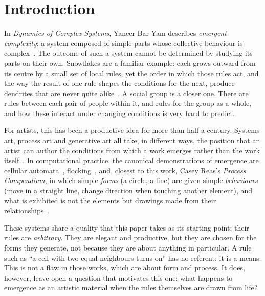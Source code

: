 \section{Introduction}
\label{sec:introduction}

In \emph{Dynamics of Complex Systems}, Yaneer Bar-Yam describes \emph{emergent complexity}: a system composed of simple parts whose collective behaviour is complex~\cite{baryam1997}. The outcome of such a system cannot be determined by studying its parts on their own. Snowflakes are a familiar example: each grows outward from its centre by a small set of local rules, yet the order in which those rules act, and the way the result of one rule shapes the conditions for the next, produce dendrites that are never quite alike~\cite{snowflake2022}. A social group is a closer one. There are rules between each pair of people within it, and rules for the group as a whole, and how these interact under changing conditions is very hard to predict.

For artists, this has been a productive idea for more than half a century. Systems art, process art and generative art all take, in different ways, the position that an artist can author the conditions from which a work emerges rather than the work itself~\cite{burnham1968, galanter2003, boden2009}. In computational practice, the canonical demonstrations of emergence are cellular automata~\cite{wolfram2002, gardner1970}, flocking~\cite{reynolds1987}, and, closest to this work, Casey Reas's \emph{Process Compendium}, in which simple \emph{forms} (a circle, a line) are given simple \emph{behaviours} (move in a straight line, change direction when touching another element), and what is exhibited is not the elements but drawings made from their relationships~\cite{reas2010, reasgithub}.

These systems share a quality that this paper takes as its starting point: their rules are \emph{arbitrary}. They are elegant and productive, but they are chosen for the forms they generate, not because they are about anything in particular. A rule such as ``a cell with two equal neighbours turns on'' has no referent; it is a means. This is not a flaw in those works, which are about form and process. It does, however, leave open a question that motivates this one: what happens to emergence as an artistic material when the rules themselves are drawn from life?

